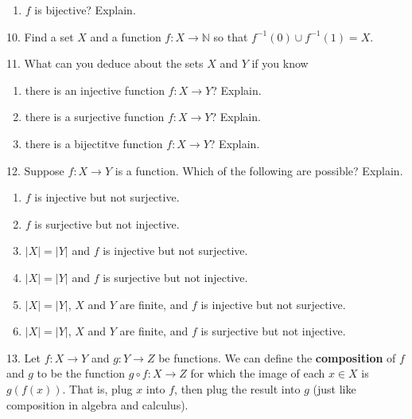 \documentclass[10pt,]{book}
\newcommand{\terminology}[1]{\textbf{#1}}
\theoremstyle{plain}
\theoremstyle{definition}
\theoremstyle{definition}
\theoremstyle{definition}
\numberwithin{equation}{chapter}
\def\N{\mathbb N}
\def\inv{^{-1}}
\begin{document}
\begin{exerciselist}
\begin{enumerate}[label=(\alph*)]
\item\hypertarget{li-442}{}\hypertarget{p-2226}{}%
\(f\) is bijective? Explain.%
\end{enumerate}
%
\par\smallskip
\item[10.]\hypertarget{exercise-91}{}\hypertarget{p-2231}{}%
Find a set \(X\) and a function \(f:X \to \N\) so that \(f\inv(0) \cup f\inv(1) = X\).%
\par\smallskip
\item[11.]\hypertarget{exercise-92}{}\hypertarget{p-2233}{}%
What can you deduce about the sets \(X\) and \(Y\) if you know \textellipsis{} \leavevmode%
\begin{enumerate}[label=(\alph*)]
\item\hypertarget{li-446}{}\hypertarget{p-2234}{}%
there is an injective function \(f:X \to Y\)? Explain.%
\item\hypertarget{li-447}{}\hypertarget{p-2235}{}%
there is a surjective function \(f:X \to Y\)? Explain.%
\item\hypertarget{li-448}{}\hypertarget{p-2236}{}%
there is a bijectitve function \(f:X \to Y\)? Explain.%
\end{enumerate}
%
\par\smallskip
\item[12.]\hypertarget{exercise-93}{}\hypertarget{p-2241}{}%
Suppose \(f:X \to Y\) is a function. Which of the following are possible? Explain. \leavevmode%
\begin{enumerate}[label=(\alph*)]
\item\hypertarget{li-452}{}\(f\) is injective but not surjective.%
\item\hypertarget{li-453}{}\(f\) is surjective but not injective.%
\item\hypertarget{li-454}{}\(|X| = |Y|\) and \(f\) is injective but not surjective.%
\item\hypertarget{li-455}{}\(|X| = |Y|\) and \(f\) is surjective but not injective.%
\item\hypertarget{li-456}{}\(|X| = |Y|\), \(X\) and \(Y\) are finite, and \(f\) is injective but not surjective.%
\item\hypertarget{li-457}{}\(|X| = |Y|\), \(X\) and \(Y\) are finite, and \(f\) is surjective but not injective.%
\end{enumerate}
%
\par\smallskip
\item[13.]\hypertarget{exercise-94}{}\hypertarget{p-2249}{}%
Let \(f:X \to Y\) and \(g:Y \to Z\) be functions.  We can define the \terminology{composition} of \(f\) and \(g\) to be the function \(g\circ f:X \to Z\) for which the image of each \(x \in X\) is \(g(f(x))\).  That is, plug \(x\) into \(f\), then plug the result into \(g\) (just like composition in algebra and calculus).%

\end{exerciselist}
\end{document}
